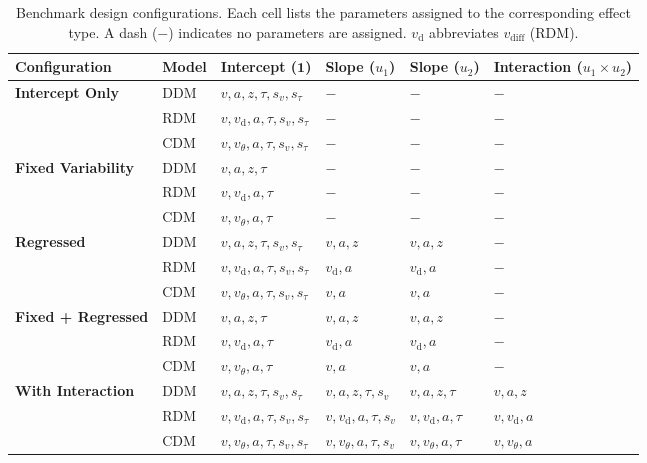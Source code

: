\begin{table}[ht]
\centering
\small
\caption{Benchmark design configurations. Each cell lists the parameters assigned to the corresponding effect type. A dash ($-$) indicates no parameters are assigned. $v_{\mathrm{d}}$ abbreviates $v_{\mathrm{diff}}$ (RDM).}
\label{tab:benchmark-configs}
\begin{tabular}{llllll}
\toprule
\textbf{Configuration} & \textbf{Model} & \textbf{Intercept} ($\mathbf{1}$) & \textbf{Slope} ($u_1$) & \textbf{Slope} ($u_2$) & \textbf{Interaction} ($u_1{\times}u_2$) \\
\midrule
\textbf{Intercept Only} & DDM & $v, a, z, \tau, s_v, s_\tau$ & $-$ & $-$ & $-$ \\
 & RDM & $v, v_{\mathrm{d}}, a, \tau, s_v, s_\tau$ & $-$ & $-$ & $-$ \\
 & CDM & $v, v_\theta, a, \tau, s_v, s_\tau$ & $-$ & $-$ & $-$ \\
\midrule
\textbf{Fixed Variability} & DDM & $v, a, z, \tau$ & $-$ & $-$ & $-$ \\
 & RDM & $v, v_{\mathrm{d}}, a, \tau$ & $-$ & $-$ & $-$ \\
 & CDM & $v, v_\theta, a, \tau$ & $-$ & $-$ & $-$ \\
\midrule
\textbf{Regressed} & DDM & $v, a, z, \tau, s_v, s_\tau$ & $v, a, z$ & $v, a, z$ & $-$ \\
 & RDM & $v, v_{\mathrm{d}}, a, \tau, s_v, s_\tau$ & $v_{\mathrm{d}}, a$ & $v_{\mathrm{d}}, a$ & $-$ \\
 & CDM & $v, v_\theta, a, \tau, s_v, s_\tau$ & $v, a$ & $v, a$ & $-$ \\
\midrule
\textbf{Fixed + Regressed} & DDM & $v, a, z, \tau$ & $v, a, z$ & $v, a, z$ & $-$ \\
 & RDM & $v, v_{\mathrm{d}}, a, \tau$ & $v_{\mathrm{d}}, a$ & $v_{\mathrm{d}}, a$ & $-$ \\
 & CDM & $v, v_\theta, a, \tau$ & $v, a$ & $v, a$ & $-$ \\
\midrule
\textbf{With Interaction} & DDM & $v, a, z, \tau, s_v, s_\tau$ & $v, a, z, \tau, s_v$ & $v, a, z, \tau$ & $v, a, z$ \\
 & RDM & $v, v_{\mathrm{d}}, a, \tau, s_v, s_\tau$ & $v, v_{\mathrm{d}}, a, \tau, s_v$ & $v, v_{\mathrm{d}}, a, \tau$ & $v, v_{\mathrm{d}}, a$ \\
 & CDM & $v, v_\theta, a, \tau, s_v, s_\tau$ & $v, v_\theta, a, \tau, s_v$ & $v, v_\theta, a, \tau$ & $v, v_\theta, a$ \\
\bottomrule
\end{tabular}
\end{table}